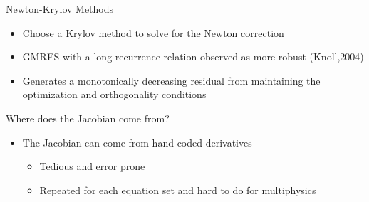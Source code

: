 \documentclass{beamer}
\begin{document}
\begin{frame}{Newton-Krylov Methods}

  \begin{itemize}
  \item Choose a Krylov method to solve for the Newton correction
  \item GMRES with a long recurrence relation observed as more
    robust (Knoll,2004)
  \item Generates a monotonically decreasing residual from
    maintaining the optimization and orthogonality conditions
  \end{itemize}

  \pause Where does the Jacobian come from?
  \begin{itemize}
  \item The Jacobian can come from hand-coded derivatives
    \begin{itemize}
    \item Tedious and error prone
    \item Repeated for each equation set and hard to do for
      multiphysics
    \end{itemize}
  \end{itemize} 

\end{frame}
\end{document}
